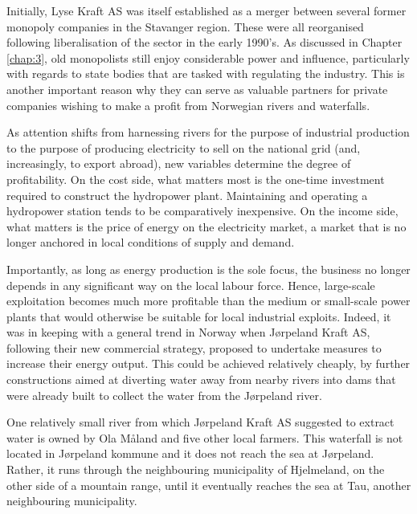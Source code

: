 Initially, Lyse Kraft AS was itself established as a merger between several former monopoly companies in the Stavanger region. These were all reorganised following liberalisation of the sector in the early 1990's. As discussed in Chapter \ref{chap:3}, old monopolists still enjoy considerable power and influence, particularly with regards to state bodies that are tasked with regulating the industry. This is another important reason why they can serve as valuable partners for private companies wishing to make a profit from Norwegian rivers and waterfalls.

As attention shifts from harnessing rivers for the purpose of industrial production to the purpose of producing electricity to sell on the national grid (and, increasingly, to export abroad), new variables determine the degree of profitability. On the cost side, what matters most is the one-time investment required to construct the hydropower plant. Maintaining and operating a hydropower station tends to be comparatively inexpensive. On the income side, what matters is the price of energy on the electricity market, a market that is no longer anchored in local conditions of supply and demand.

Importantly, as long as energy production is the sole focus, the business no longer depends in any significant way on the local labour force. Hence, large-scale exploitation becomes much more profitable than the medium or small-scale power plants that would otherwise be suitable for local industrial exploits. Indeed, it was in keeping with a general trend in Norway when Jørpeland Kraft AS, following  their new commercial strategy, proposed to undertake measures to increase their energy output. This could be achieved relatively cheaply, by further constructions aimed at diverting water away from nearby rivers into dams that were already built to collect the water from the Jørpeland river.

One relatively small river from which Jørpeland Kraft AS suggested to extract water is owned by Ola Måland and five other local farmers. This waterfall is not located in Jørpeland kommune and it does not reach the sea at Jørpeland. Rather, it runs through the neighbouring municipality of Hjelmeland, on the other side of a mountain range, until it eventually reaches the sea at Tau, another neighbouring municipality. 

